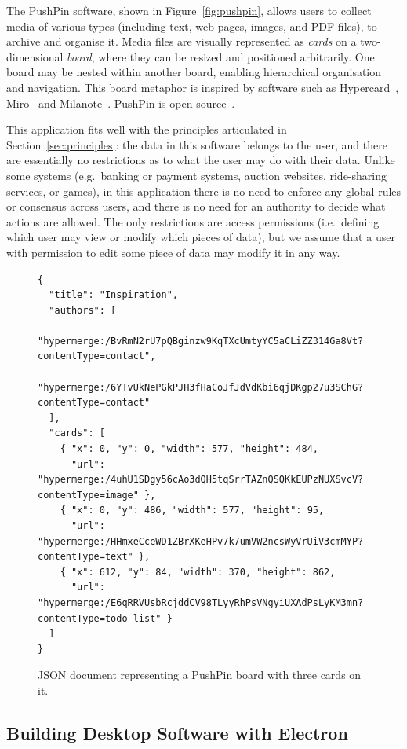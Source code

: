 \documentclass[sigplan,10pt]{acmart}
\begin{document}
The PushPin software, shown in Figure~\ref{fig:pushpin}, allows users to collect media of various types (including text, web pages, images, and PDF files), to archive and organise it.
Media files are visually represented as \emph{cards} on a two-dimensional \emph{board}, where they can be resized and positioned arbitrarily.
One board may be nested within another board, enabling hierarchical organisation and navigation.
This board metaphor is inspired by software such as Hypercard~\cite{HyperCard}, Miro~\cite{Miro} and Milanote~\cite{Milanote}.
PushPin is open source~\cite{PushPinSource}.

This application fits well with the principles articulated in Section~\ref{sec:principles}: the data in this software belongs to the user, and there are essentially no restrictions as to what the user may do with their data.
Unlike some systems (e.g.\ banking or payment systems, auction websites, ride-sharing services, or games), in this application there is no need to enforce any global rules or consensus across users, and there is no need for an authority to decide what actions are allowed.
The only restrictions are access permissions (i.e.\ defining which user may view or modify which pieces of data), but we assume that a user with permission to edit some piece of data may modify it in any way.

\begin{figure}
\begin{verbatim}
{
  "title": "Inspiration",
  "authors": [
    "hypermerge:/BvRmN2rU7pQBginzw9KqTXcUmtyYC5aCLiZZ314Ga8Vt?contentType=contact",
    "hypermerge:/6YTvUkNePGkPJH3fHaCoJfJdVdKbi6qjDKgp27u3SChG?contentType=contact"
  ],
  "cards": [
    { "x": 0, "y": 0, "width": 577, "height": 484,
      "url": "hypermerge:/4uhU1SDgy56cAo3dQH5tqSrrTAZnQSQKkEUPzNUXSvcV?contentType=image" },
    { "x": 0, "y": 486, "width": 577, "height": 95,
      "url": "hypermerge:/HHmxeCceWD1ZBrXKeHPv7k7umVW2ncsWyVrUiV3cmMYP?contentType=text" },
    { "x": 612, "y": 84, "width": 370, "height": 862,
      "url": "hypermerge:/E6qRRVUsbRcjddCV98TLyyRhPsVNgyiUXAdPsLyKM3mn?contentType=todo-list" }
  ]
}
\end{verbatim}
\caption{JSON document representing a PushPin board with three cards on it.}
\label{fig:board-json}
\end{figure}

\subsection{Building Desktop Software with Electron}
\end{document}
